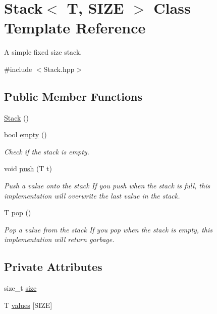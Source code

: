 \hypertarget{classStack}{\section{Stack$<$ T, S\-I\-Z\-E $>$ Class Template Reference}
\label{classStack}
}


A simple fixed size stack.  




{\ttfamily \#include $<$Stack.\-hpp$>$}

\subsection*{Public Member Functions}
\begin{DoxyCompactItemize}
\item 
\hyperlink{classStack_ab1fc0ee4439d367bb92facdc37766a7a}{Stack} ()
\item 
bool \hyperlink{classStack_a505bf640900c9ddd08a7666e85c7d53c}{empty} ()
\begin{DoxyCompactList}\small\item\em Check if the stack is empty. \end{DoxyCompactList}\item 
void \hyperlink{classStack_a57cb3e28d1b7349dfea8e42c95186abc}{push} (T t)
\begin{DoxyCompactList}\small\item\em Push a value onto the stack If you push when the stack is full, this implementation will overwrite the last value in the stack. \end{DoxyCompactList}\item 
T \hyperlink{classStack_a0ec82a1e0e291e07f3fd5ef616b09423}{pop} ()
\begin{DoxyCompactList}\small\item\em Pop a value from the stack If you pop when the stack is empty, this implementation will return garbage. \end{DoxyCompactList}\end{DoxyCompactItemize}
\subsection*{Private Attributes}
\begin{DoxyCompactItemize}
\item 
size\-\_\-t \hyperlink{classStack_a2bf4c06162c7356ca41792de93a68f49}{size}
\item 
T \hyperlink{classStack_ad6737211e34f9e427b9c91f32a16ad18}{values} \mbox{[}S\-I\-Z\-E\mbox{]}
\end{DoxyCompactItemize}


